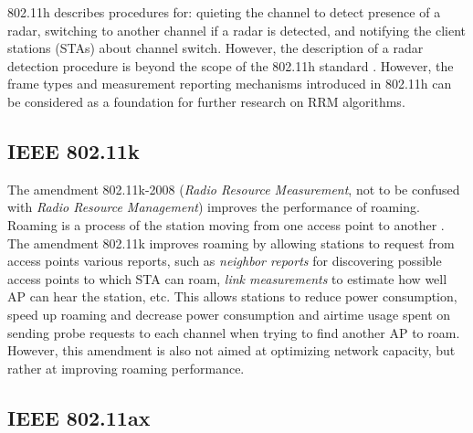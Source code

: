 802.11h describes procedures for: quieting the channel to detect presence of a radar, switching to another channel if a radar is detected, and notifying the client stations (STAs) about channel switch. However, the description of a radar detection procedure is beyond the scope of the 802.11h standard \cite{ieee80211h}.
However, the frame types and measurement reporting mechanisms introduced in 802.11h can be considered as a foundation for further research on RRM algorithms.



\subsection {IEEE 802.11k}
\label{chap:lr:sec:80211k}
The amendment 802.11k-2008 \cite{ieee80211k} (\textit{Radio Resource Measurement}, not to be confused with \textit{Radio Resource Management}) improves the performance of roaming. Roaming is a process of the station moving from one access point to another \cite{colemanCWNACertifiedWireless2021}. The amendment 802.11k improves roaming by allowing stations to request from access points various reports, such as \textit{neighbor reports} for discovering possible access points to which STA can roam, \textit{ link measurements} to estimate how well AP can hear the station, etc. This allows stations to reduce power consumption, speed up roaming and decrease power consumption and airtime usage spent on sending probe requests to each channel when trying to find another AP to roam.
However, this amendment is also not aimed at optimizing network capacity, but rather at improving roaming performance.

\subsection {IEEE 802.11ax}
\label{chap:lr:sec:80211ax}

